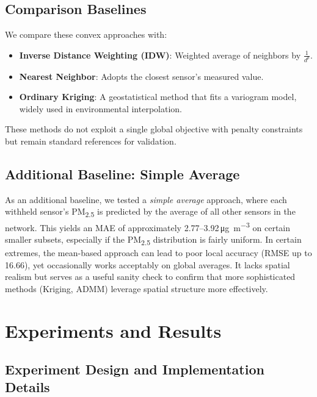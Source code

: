 \documentclass[12pt]{article}                                %
\begin{document}
\subsection{Comparison Baselines}
\label{sec:comparison_baselines}   %
We compare these convex approaches with:
\begin{itemize}
    \item \textbf{Inverse Distance Weighting (IDW)}: Weighted average of neighbors by $\tfrac{1}{d^p}$.
    \item \textbf{Nearest Neighbor}: Adopts the closest sensor's measured value.
    \item \textbf{Ordinary Kriging}: A geostatistical method that fits a variogram model, widely 
    used in environmental interpolation. 
\end{itemize}
These methods do not exploit a single global objective with penalty constraints but remain 
standard references for validation.

\subsection{Additional Baseline: Simple Average}
\label{sec:baselineSimpleAvg}   %

As an additional baseline, we tested a \emph{simple average} approach, 
where each withheld sensor's PM\textsubscript{2.5} is predicted by the average of all other 
sensors in the network. This yields an MAE of approximately 2.77--3.92\,\si{\micro\gram\per\cubic\meter} 
on certain smaller subsets, especially if the PM\textsubscript{2.5} distribution is fairly uniform. 
In certain extremes, the mean-based approach can lead to poor local accuracy (RMSE up to 16.66), 
yet occasionally works acceptably on global averages. It lacks spatial realism but serves as a 
useful sanity check to confirm that more sophisticated methods (Kriging, ADMM) leverage spatial 
structure more effectively.

\section{Experiments and Results}
\label{sec:experiments}  %

\subsection{Experiment Design and Implementation Details}   %
\end{document}
